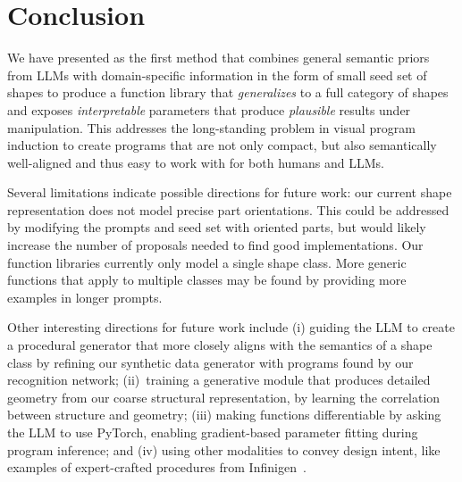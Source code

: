 \section{Conclusion}

We have presented \methodname as the first method that combines general semantic priors from LLMs with domain-specific information in the form of small seed set of shapes to produce a function library that \emph{generalizes} to a full category of shapes and exposes \emph{interpretable} parameters that produce \emph{plausible} results under manipulation.
This addresses the long-standing problem in visual program induction to create programs that are not only compact, but also semantically well-aligned and thus easy to work with for both humans and LLMs.

Several limitations indicate possible directions for future work: our current shape representation does not model precise part orientations. This could be addressed by modifying the prompts and seed set with oriented parts, but would likely increase the number of proposals needed to find good implementations. Our function libraries currently only model a single shape class. More generic functions that apply to multiple classes may be found by providing more examples in longer prompts.

Other interesting directions for future work include 
(i) guiding the LLM to create a procedural generator that more closely aligns with the semantics of a shape class by refining our synthetic data generator with programs found by our recognition network;
(ii)~training a generative module that produces detailed geometry from our coarse structural representation, by learning the correlation between structure and geometry;
(iii) making functions differentiable by asking the LLM to use PyTorch, enabling gradient-based parameter fitting during program inference;
and (iv) using other modalities to convey design intent, like examples of expert-crafted procedures from Infinigen~\cite{infinigen2024indoors}. 

